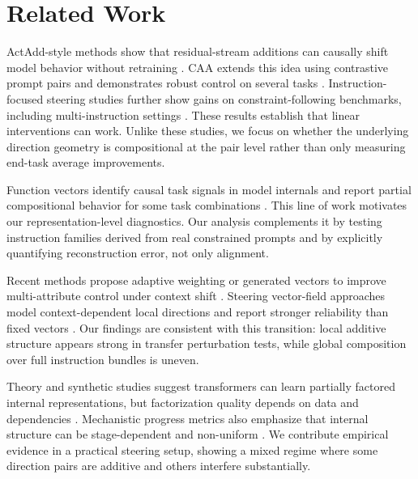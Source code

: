 \section{Related Work}
\label{sec:related_work}
ActAdd-style methods show that residual-stream additions can causally shift model behavior without retraining \citep{turner2023activation}. CAA extends this idea using contrastive prompt pairs and demonstrates robust control on several tasks \citep{panickssery2024caa}. Instruction-focused steering studies further show gains on constraint-following benchmarks, including multi-instruction settings \citep{stolfo2025instruction}. These results establish that linear interventions can work. Unlike these studies, we focus on whether the underlying direction geometry is compositional at the pair level rather than only measuring end-task average improvements.

Function vectors identify causal task signals in model internals and report partial compositional behavior for some task combinations \citep{todd2024function}. This line of work motivates our representation-level diagnostics. Our analysis complements it by testing instruction families derived from real constrained prompts and by explicitly quantifying reconstruction error, not only alignment.

Recent methods propose adaptive weighting or generated vectors to improve multi-attribute control under context shift \citep{scalena2024dynamic,sun2025hypersteer}. Steering vector-field approaches model context-dependent local directions and report stronger reliability than fixed vectors \citep{li2026vectorfields}. Our findings are consistent with this transition: local additive structure appears strong in transfer perturbation tests, while global composition over full instruction bundles is uneven.

Theory and synthetic studies suggest transformers can learn partially factored internal representations, but factorization quality depends on data and dependencies \citep{shai2026factored}. Mechanistic progress metrics also emphasize that internal structure can be stage-dependent and non-uniform \citep{nanda2023grokking}. We contribute empirical evidence in a practical steering setup, showing a mixed regime where some direction pairs are additive and others interfere substantially.
